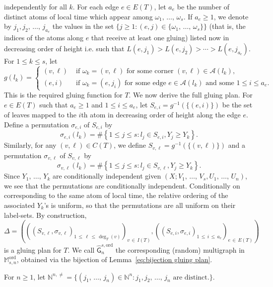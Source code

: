 \documentclass[AHL,Unicode,longabstracts,published]{cedram}
\newcommand{\ord}{\mathrm{ord}}
\newcommand{\cA}{\mathcal{A}}
\newcommand{\sG}{\mathsf{G}}
\newcommand{\M}{\mathbb{M}}
\newcommand{\N}{\mathbb{N}}
\begin{document}
independently for all $k$. For each edge $e\in E(T)$, let $a_e$ be the number of distinct atoms of local time which appear among $\omega_1,\,\ldots,\,\omega_s$. If $a_e \ge 1$, we denote by $j_1,j_2,\,\dots,\, j_{a_e}$ the values in the set $\{j\geq 1: (e,j)\in \{\omega_1,\,\ldots,\,\omega_s\}\}$ (that is, the indices of the atoms along $e$ that receive at least one gluing) listed now in decreasing order of height i.e. such that $L(e, j_1) > L(e, j_2) > \cdots > L(e, j_{a_e})$. For $1 \le k \le s$, let
\[
g(l_k) =
\begin{cases}
(v,\ell) & \text{ if $\omega_k = (v,\ell)$ for some corner $(v,\ell) \in \cA(l_k)$,} \\
(e,i) & \text{ if $\omega_k = (e, j_{i})$ for some edge $e \in \cA(l_k)$ and some $1 \le i \le a_e$}.
\end{cases}
\]
This is the required gluing function for $T$. We now derive the full gluing plan. For $e \in E(T)$ such that $a_e \ge 1$ and $1 \le i \le a_e$, let $S_{e,i} = g^{-1}(\{(e,i)\})$ be the set of leaves mapped to the $i$th atom in decreasing order of height along the edge $e$. Define a permutation $\sigma_{e,i}$ of $S_{e,i}$ by
\[
\sigma_{e,i}(l_k) = \#\left\{1 \le j \le s: l_j \in S_{e,i}, Y_j \ge Y_k\right\}.
\]
Similarly, for any $(v,\ell)\in C(T)$, we define $S_{v,\ell} = g^{-1}(\{(v,\ell)\})$ and a permutation $\sigma_{v,\ell}$ of $S_{v,\ell}$ by
\[
\sigma_{v,\ell}(l_k)= \#\left\{1\leq j\leq s: l_j\in S_{v,\ell}, Y_j \geq Y_k\right\}.
\]
Since $Y_1,\,\ldots,\,Y_k$ are conditionally independent given $(X; V_1,\,\ldots,\,V_s, U_1, \,\ldots,\,U_n)$, we see that the permutations are conditionally independent. Conditionally on corresponding to the same atom of local time, the relative ordering of the associated $Y_k$'s is uniform, so that the permutations are all uniform on their label-sets. By construction,
\[
\Delta=\left(\left(\left(S_{v,\ell}, \sigma_{v,\ell}\right)_{1\,\le\,\ell\,\le\,\deg_T(v)} \right)_{v\,\in\,I(T)}, \left(\left(S_{e,i},\sigma_{e,i}\right)_{1\,\le\,i\,\le\,a_e} \right)_{e\,\in\,E(T)} \right)
\]
is a gluing plan for $T$. We call $\widehat{\sG}_{n}^{s,\ord}$ the corresponding (random) multigraph in $\M_{s,n}^{\ord}$, obtained via the bijection of Lemma~\ref{eq:bijection gluing plan}.

For $n \ge 1$, let $\N^{n, \neq} = \{(j_1,\,\ldots, \,j_n) \in \N^n:  j_1, j_2,\,\ldots,\, j_n\text{ are distinct.} \}$.
\end{document}
